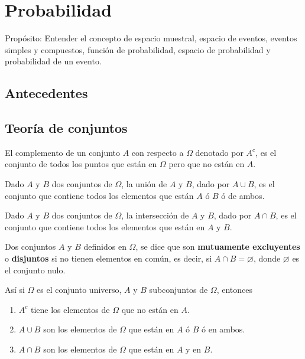 \chapter{Probabilidad}

Propósito: Entender el concepto de espacio muestral, espacio de eventos, eventos simples y compuestos, función de probabilidad, espacio de probabilidad y  probabilidad de un evento.


\section{Antecedentes}

\section{Teoría de conjuntos}


\begin{definition}
El complemento de un conjunto $A$ con respecto a $\Omega$ denotado por $A^{c}$, es el conjunto de todos los puntos que están en $\Omega$ pero que no están en $A$.
\end{definition}

\begin{definition}
Dado $A$ y $B$ dos conjuntos de $\Omega$, la unión de $A$ y $B$, dado por $A\cup B$, es el conjunto que contiene todos los elementos que están $A$ ó $B$ ó de ambos.
\end{definition}

\begin{definition}
Dado $A$ y $B$ dos conjuntos de $\Omega$, la intersección de $A$ y $B$, dado por $A\cap B$, es el conjunto que contiene todos los elementos que están en $A$ y $B$.
\end{definition}

\begin{definition}
Dos conjuntos $A$ y $B$ definidos en $\Omega $, se dice que son  \textbf{mutuamente excluyentes} o  \textbf{disjuntos} si no tienen elementos en común, es decir, si $A\cap B=\varnothing$, donde $\varnothing$ es el conjunto nulo.
\end{definition}

Así si $\Omega$ es el conjunto universo, $A$ y $B$ subconjuntos de $\Omega$, entonces

\begin{enumerate}[1]
\item $A^{c}$ tiene los elementos de $\Omega$ que no están en $A$.

\item $A\cup B$ son los elementos de $\Omega$ que están en $A$ ó $B$ ó en ambos.
\item $A\cap B$ son los elementos de $\Omega$ que están en $A$ y en $B$.

\end{enumerate}


